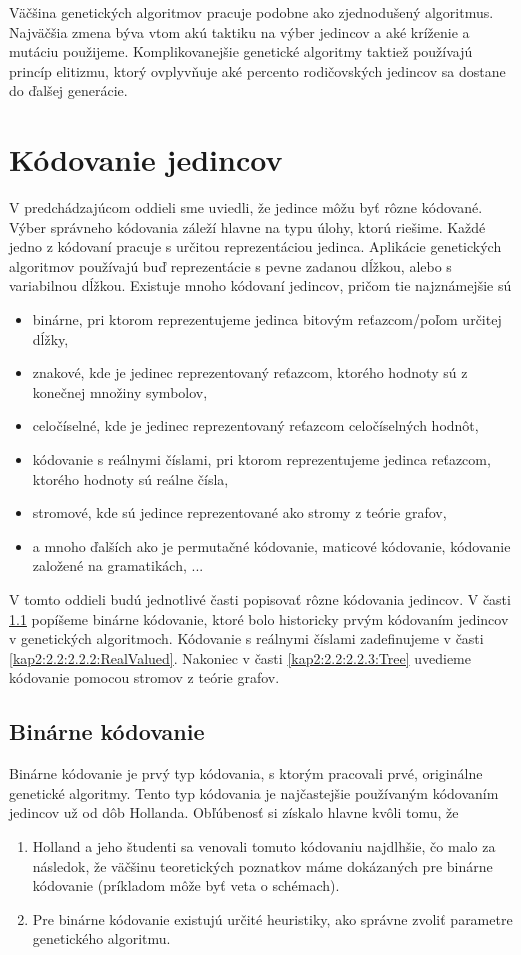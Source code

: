 Väčšina genetických algoritmov pracuje podobne ako zjednodušený algoritmus. Najväčšia zmena býva vtom akú taktiku na výber jedincov a aké kríženie a mutáciu použijeme. Komplikovanejšie genetické algoritmy taktiež používajú princíp elitizmu, ktorý ovplyvňuje aké percento rodičovských jedincov sa dostane do ďalšej generácie.

\section{Kódovanie jedincov}\label{kap2:2.2:Coding}
V predchádzajúcom oddieli sme uviedli, že jedince môžu byť rôzne kódované. Výber správneho kódovania záleží hlavne na typu úlohy, ktorú riešime. Každé jedno z kódovaní pracuje s určitou reprezentáciou jedinca. Aplikácie genetických algoritmov používajú buď reprezentácie s pevne zadanou dĺžkou, alebo s variabilnou dĺžkou. Existuje mnoho kódovaní jedincov, pričom tie najznámejšie sú
\begin{itemize}
\item binárne, pri ktorom reprezentujeme jedinca bitovým reťazcom/poľom určitej dĺžky,
\item znakové, kde je jedinec reprezentovaný reťazcom, ktorého hodnoty sú z konečnej množiny symbolov,
\item celočíselné, kde je jedinec reprezentovaný reťazcom celočíselných hodnôt,
\item kódovanie s reálnymi číslami, pri ktorom reprezentujeme jedinca reťazcom, ktorého hodnoty sú reálne čísla,
\item stromové, kde sú jedince reprezentované ako stromy z teórie grafov,
\item a mnoho ďalších ako je permutačné kódovanie, maticové kódovanie, kódovanie založené na gramatikách, ...
\end{itemize} 

V tomto oddieli budú jednotlivé časti popisovať rôzne kódovania jedincov. V časti \ref{kap2:2.2:2.2.1:Binary} popíšeme binárne kódovanie, ktoré bolo historicky prvým kódovaním jedincov v genetických algoritmoch. Kódovanie s reálnymi číslami zadefinujeme v časti \ref{kap2:2.2:2.2.2:RealValued}. Nakoniec v časti \ref{kap2:2.2:2.2.3:Tree} uvedieme kódovanie pomocou stromov z teórie grafov.
\subsection{Binárne kódovanie}\label{kap2:2.2:2.2.1:Binary}
Binárne kódovanie je prvý typ kódovania, s ktorým pracovali prvé, originálne genetické algoritmy.
Tento typ kódovania je najčastejšie používaným kódovaním jedincov už od dôb Hollanda. Obľúbenosť si získalo hlavne kvôli tomu, že 
\begin{enumerate}
\item Holland a jeho študenti sa venovali tomuto kódovaniu najdlhšie, čo malo za následok, že väčšinu teoretických poznatkov máme dokázaných pre binárne kódovanie (príkladom môže byť veta o schémach).
\item Pre binárne kódovanie existujú určité heuristiky, ako správne zvoliť parametre genetického algoritmu.
\end{enumerate}

